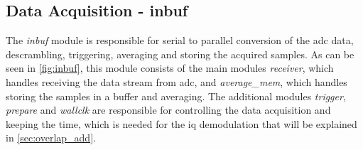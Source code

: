 \documentclass[12pt,a4paper,parskip=full,abstract=true,BCOR=12mm,twoside,open=right]{scrreprt}
\def\device#1{\mbox{\textit{#1}}}
\begin{document}

\subsection[Data Acquisition]{Data Acquisition - inbuf}
\label{sec:acquisition}

The \device{inbuf} module is responsible for serial to parallel conversion
of the \gls{adc} data, descrambling, triggering, averaging and storing
the acquired samples. As can be seen in \cref{fig:inbuf}, this module consists
of the main modules \device{receiver}, which handles receiving the data stream from
\gls{adc}, and \device{average\_mem}, which handles storing the samples in a buffer
and averaging. The additional modules \device{trigger}, \device{prepare} and
\device{wallclk} are responsible for controlling the data acquisition and keeping
the time, which is needed for the \gls{iq} demodulation that will be explained in \cref{sec:overlap_add}.
\end{document}
